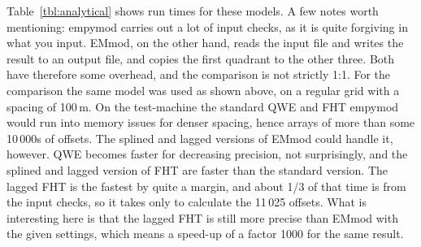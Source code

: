 \documentclass[manuscript,revised]{geophysics}
\begin{document}
Table~\ref{tbl:analytical} shows run times for these models. A few notes worth
mentioning: empymod carries out a lot of input checks, as it is quite
forgiving in what you input. EMmod, on the other hand, reads the input file
and writes the result to an output file, and copies the first quadrant to the
other three. Both have therefore some overhead, and the comparison is not
strictly 1:1. For the comparison the same model was used as shown above, on a
regular grid with a spacing of 100\,m.  On the test-machine the standard
 QWE and FHT empymod would run into memory issues for denser
spacing, hence arrays of more than some 10\,000s of offsets.  The splined and
lagged versions of EMmod could handle it, however.
%
%
QWE becomes faster for decreasing precision, not surprisingly, and the splined
and lagged version of FHT are faster than the standard version. The lagged FHT
is the fastest by quite a margin, and about 1/3 of that time is from the input
checks, so it takes only  to calculate
the 11\,025 offsets.  What is interesting here is that the lagged FHT is still
more precise than EMmod with the given settings, which means a speed-up of a
factor 1000 for the same result.
\end{document}

